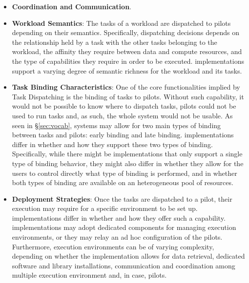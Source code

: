 \documentclass{sig-alternate}
\begin{document}
\begin{itemize}
\item \textbf{Coordination and Communication}. 

\item \textbf{Workload Semantics}: The tasks of a workload are
  dispatched to pilots depending on their semantics. Specifically,
  dispatching decisions depends on the relationship held by a task
  with the other tasks belonging to the workload, the affinity they
  require between data and compute resources, and the type of
  capabilities they require in order to be executed.  \pilotjob
  implementations support a varying degree of semantic richness for
  the workload and its tasks.

\item \textbf{Task Binding Characteristics}: One of the core
  functionalities implied by Task Dispatching is the binding of tasks
  to pilots. Without such capability, it would not be possible to know
  where to dispatch tasks, pilots could not be used to run tasks and,
  as such, the whole \pilotjob system would not be usable. As seen in
  \S\ref{sec:vocab}, \pilotjob systems may allow for two main types of
  binding between tasks and pilots: early binding and late
  binding. \pilotjob implementations differ in whether and how they
  support these two types of binding. Specifically, while there might
  be implementations that only support a single type of binding
  behavior, they might also differ in whether they allow for the users
  to control directly what type of binding is performed, and in
  whether both types of binding are available on an heterogeneous pool
  of resources.

\item \textbf{Deployment Strategies}: Once the tasks are dispatched to
  a pilot, their execution may require for a specific environment to
  be set up.  \pilotjob implementations differ in whether and how they
  offer such a capability. \pilotjob implementations may adopt
  dedicated components for managing execution environments, or they
  may relay an ad hoc configuration of the pilots. Furthermore,
  execution environments can be of varying complexity, depending on
  whether the \pilotjob implementation allows for data retrieval,
  dedicated software and library installations, communication and
  coordination among multiple execution environment and, in case,
  pilots.

\end{itemize}
\end{document}
